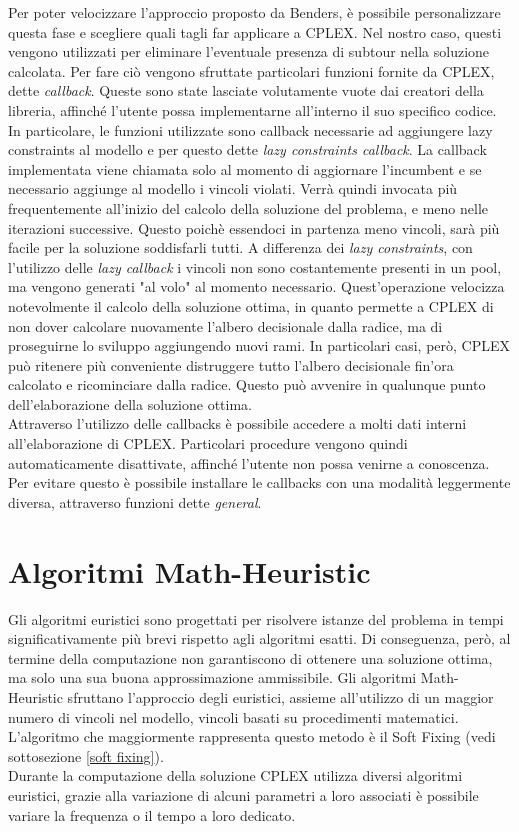 Per poter velocizzare l'approccio proposto da Benders, è possibile personalizzare questa fase e scegliere quali tagli far applicare a CPLEX. Nel nostro caso, questi vengono utilizzati per eliminare l'eventuale presenza di subtour nella soluzione calcolata. Per fare ciò vengono sfruttate particolari funzioni fornite da CPLEX, dette \textit{callback}. Queste sono state lasciate volutamente vuote dai creatori della libreria, affinché l'utente possa implementarne all'interno il suo specifico codice. In particolare, le funzioni utilizzate sono callback necessarie ad aggiungere lazy constraints al modello e per questo dette \textit{lazy constraints callback}. La callback implementata viene chiamata solo al momento di aggiornare l'incumbent e se necessario aggiunge al modello i vincoli violati. Verrà quindi invocata più frequentemente all'inizio del calcolo della soluzione del problema, e meno nelle iterazioni successive. Questo poichè essendoci in partenza meno vincoli, sarà più facile per la soluzione soddisfarli tutti. A differenza dei \textit{lazy constraints}, con l'utilizzo delle \textit{lazy callback} i vincoli non sono costantemente presenti in un pool, ma vengono generati "al volo" al momento necessario.  Quest'operazione velocizza notevolmente il calcolo della soluzione ottima, in quanto permette a CPLEX di non dover calcolare nuovamente l'albero decisionale dalla radice, ma di proseguirne lo sviluppo aggiungendo nuovi rami. In particolari casi, però, CPLEX può ritenere più conveniente distruggere tutto l'albero decisionale fin'ora calcolato e ricominciare dalla radice. Questo può avvenire in qualunque punto dell'elaborazione della soluzione ottima.\\
Attraverso l'utilizzo delle callbacks è possibile accedere a molti dati interni all'elaborazione di CPLEX. Particolari procedure vengono quindi automaticamente disattivate, affinché l'utente non possa venirne a conoscenza. Per evitare questo è possibile installare le callbacks con una modalità leggermente diversa, attraverso funzioni dette \textit{general}.
\section{Algoritmi Math-Heuristic}
Gli algoritmi euristici sono progettati per risolvere istanze del problema in tempi significativamente più brevi rispetto agli algoritmi esatti. Di conseguenza, però, al termine della computazione non garantiscono di ottenere una soluzione ottima, ma solo una sua buona approssimazione ammissibile. Gli algoritmi Math-Heuristic sfruttano l'approccio degli euristici, assieme all'utilizzo di un maggior numero di vincoli nel modello, vincoli basati su procedimenti matematici. L'algoritmo che maggiormente rappresenta questo metodo è il Soft Fixing (vedi sottosezione \ref{soft fixing}). \\
Durante la computazione della soluzione CPLEX utilizza diversi algoritmi euristici, grazie alla variazione di alcuni parametri a loro associati è possibile variare la frequenza o il tempo a loro dedicato. 
